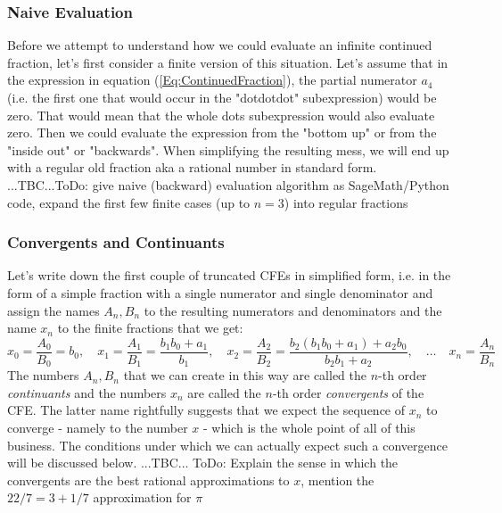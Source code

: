 \subsubsection{Naive Evaluation}
Before we attempt to understand how we could evaluate an infinite continued fraction, let's first consider a finite version of this situation. Let's assume that in the expression in equation (\ref{Eq:ContinuedFraction}), the partial numerator $a_4$ (i.e. the first one that would occur in the "dotdotdot" subexpression) would be zero. That would mean that the whole dots subexpression would also evaluate zero. Then we could evaluate the expression from the "bottom up" or from the "inside out" or "backwards". When simplifying the resulting mess, we will end up with a regular old fraction aka a rational number in standard form. ...TBC...ToDo: give naive (backward) evaluation algorithm as SageMath/Python code, expand the first few finite cases (up to $n=3$) into regular fractions



\subsubsection{Convergents and Continuants}
Let's write down the first couple of truncated CFEs in simplified form, i.e. in the form of a simple fraction with a single numerator and single denominator and assign the names $A_n, B_n$ to the resulting numerators and denominators and the name $x_n$ to the finite fractions that we get:
\begin{equation}
\label{Eq:ContinuantsAndConvergents}
x_0 = \frac{A_0}{B_0} = b_0, \quad
x_1 = \frac{A_1}{B_1} = \frac{b_1 b_0 + a_1}{b_1}, \quad
x_2 = \frac{A_2}{B_2} = \frac{b_2(b_1 b_0 + a_1) + a_2 b_0}{b_2 b_1 + a_2}, \quad
\ldots \quad
x_n = \frac{A_n}{B_n}
\end{equation}
The numbers $A_n, B_n$ that we can create in this way are called the $n$-th order \emph{continuants} and the numbers $x_n$ are called the $n$-th order \emph{convergents} of the CFE. The latter name rightfully suggests that we expect the sequence of $x_n$ to converge - namely to the number $x$ - which is the whole point of all of this business. The conditions under which we can actually expect such a convergence will be discussed below. ...TBC... ToDo: Explain the sense in which the convergents are the best rational approximations to $x$, mention the $22/7 = 3 + 
1/7$ approximation for $\pi$

